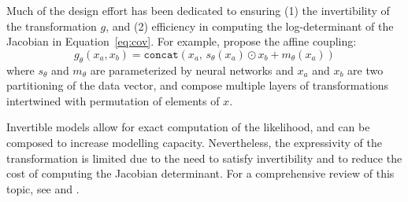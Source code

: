\documentclass{article}
\begin{document}
Much of the design effort has been dedicated to ensuring (1) the invertibility of the transformation $g$, and (2) efficiency in computing the log-determinant of the Jacobian in Equation~\ref{eq:cov}. 
For example, \citet{dinh2016density} propose the affine coupling:
$$g_\theta(x_a, x_b) = \texttt{concat}(x_a,\, s_\theta(x_a)\odot x_b + m_\theta(x_a))$$
where $s_\theta$ and $m_\theta$ are parameterized by neural networks and $x_a$ and $x_b$ are two partitioning of the data vector, 
and compose multiple layers of transformations intertwined with permutation of elements of $x$. 


Invertible models allow for exact computation of the likelihood, and can be composed to increase modelling capacity. 
Nevertheless, the expressivity of the transformation is limited due to the need to satisfy invertibility and to reduce the cost of computing the Jacobian determinant. 
For a comprehensive review of this topic, see \citet{kobyzev2019normalizing} and \citet{papamakarios2019normalizing}.
\end{document}
